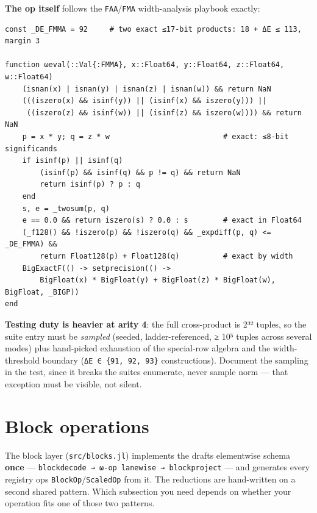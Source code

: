 \textbf{The op itself} follows the \texttt{FAA}/\texttt{FMA} width-analysis playbook exactly:




\begin{verbatim}
const _DE_FMMA = 92     # two exact ≤17-bit products: 18 + ΔE ≤ 113, margin 3

function ωeval(::Val{:FMMA}, x::Float64, y::Float64, z::Float64, w::Float64)
    (isnan(x) | isnan(y) | isnan(z) | isnan(w)) && return NaN
    (((iszero(x) && isinf(y)) || (isinf(x) && iszero(y))) ||
     ((iszero(z) && isinf(w)) || (isinf(z) && iszero(w)))) && return NaN
    p = x * y; q = z * w                          # exact: ≤8-bit significands
    if isinf(p) || isinf(q)
        (isinf(p) && isinf(q) && p != q) && return NaN
        return isinf(p) ? p : q
    end
    s, e = _twosum(p, q)
    e == 0.0 && return iszero(s) ? 0.0 : s        # exact in Float64
    (_f128() && !iszero(p) && !iszero(q) && _expdiff(p, q) <= _DE_FMMA) &&
        return Float128(p) + Float128(q)          # exact by width
    BigExactF(() -> setprecision(() ->
        BigFloat(x) * BigFloat(y) + BigFloat(z) * BigFloat(w), BigFloat, _BIGP))
end
\end{verbatim}



\textbf{Testing duty is heavier at arity 4}: the full cross-product is 2³² tuples, so the suite entry must be \emph{sampled} (seeded, ladder-referenced, ≥ 10⁵ tuples across several modes) plus hand-picked exhaustion of the special-row algebra and the width-threshold boundary (\texttt{ΔE ∈ \{91, 92, 93\}} constructions). Document the sampling in the test, since it breaks the suite{\textquotesingle}s {\textquotedbl}enumerate, never sample{\textquotedbl} norm — that exception must be visible, not silent.



\section{Block operations}



\label{6513894782918662055}{}


The block layer (\texttt{src/blocks.jl}) implements the draft{\textquotesingle}s elementwise schema \textbf{once} — \texttt{blockdecode → ω-op lanewise → blockproject} — and generates every registry op{\textquotesingle}s \texttt{BlockOp}/\texttt{ScaledOp} from it. The reductions are hand-written on a second shared pattern. Which subsection you need depends on whether your operation fits one of those two patterns.




